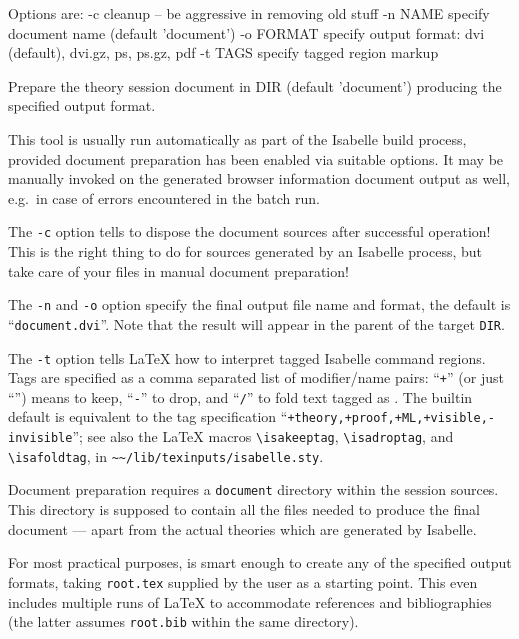 \begin{isabellebody}
\begin{isamarkuptext}
\begin{ttbox}
  Options are:
    -c           cleanup -- be aggressive in removing old stuff
    -n NAME      specify document name (default 'document')
    -o FORMAT    specify output format: dvi (default), dvi.gz, ps,
                 ps.gz, pdf
    -t TAGS      specify tagged region markup

  Prepare the theory session document in DIR (default 'document')
  producing the specified output format.
\end{ttbox}
  This tool is usually run automatically as part of the Isabelle build
  process, provided document preparation has been enabled via suitable
  options.  It may be manually invoked on the generated browser
  information document output as well, e.g.\ in case of errors
  encountered in the batch run.

  \medskip The \verb|-c| option tells \hyperlink{tool.document}{\mbox{}} to
  dispose the document sources after successful operation!  This is
  the right thing to do for sources generated by an Isabelle process,
  but take care of your files in manual document preparation!

  \medskip The \verb|-n| and \verb|-o| option specify
  the final output file name and format, the default is ``\verb|document.dvi|''.  Note that the result will appear in the parent of
  the target \verb|DIR|.

  \medskip The \verb|-t| option tells {\LaTeX} how to interpret
  tagged Isabelle command regions.  Tags are specified as a comma
  separated list of modifier/name pairs: ``\verb|+|'' (or just ``'') means to keep, ``\verb|-|'' to drop, and ``\verb|/|'' to
  fold text tagged as .  The builtin default is equivalent
  to the tag specification ``\verb|+theory,+proof,+ML,+visible,-invisible|''; see also the {\LaTeX}
  macros \verb|\isakeeptag|, \verb|\isadroptag|, and
  \verb|\isafoldtag|, in \verb|~~/lib/texinputs/isabelle.sty|.

  \medskip Document preparation requires a \verb|document|
  directory within the session sources.  This directory is supposed to
  contain all the files needed to produce the final document --- apart
  from the actual theories which are generated by Isabelle.

  \medskip For most practical purposes, \hyperlink{tool.document}{\mbox{}} is smart
  enough to create any of the specified output formats, taking
  \verb|root.tex| supplied by the user as a starting point.  This
  even includes multiple runs of {\LaTeX} to accommodate references
  and bibliographies (the latter assumes \verb|root.bib| within
  the same directory).


\end{isamarkuptext}
\end{isabellebody}
